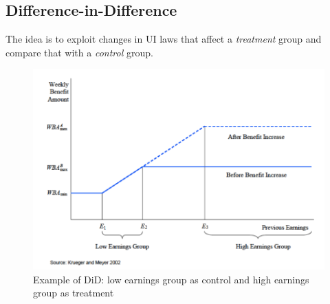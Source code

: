     \subsection{Difference-in-Difference}
        The idea is to exploit changes in UI laws that affect a \emph{treatment} group and compare that with a \emph{control} group.
        \begin{figure}[h]
            \centering
            \includegraphics[width=4 in]{images/ch1/did_1.png}
            \caption{Example of DiD: low earnings group as control and high earnings group as treatment}
        \end{figure}
